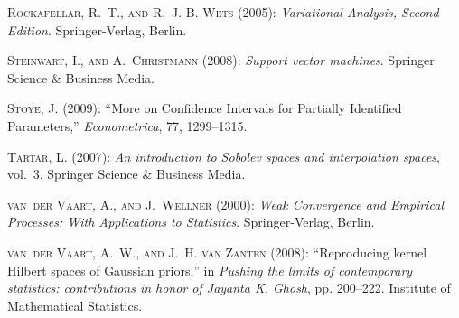 \documentclass[letterpaper,11pt]{article}
\theoremstyle{myplain}
\theoremstyle{mydefinition}
\theoremstyle{myremark}
\numberwithin{equation}{section}
\numberwithin{figure}{section}
\begin{document}
\begin{thebibliography}{}
\textsc{Rockafellar, R.~T.,  {\small and} R.~J.-B. Wets}  (2005):
  \emph{Variational Analysis, Second Edition}. Springer-Verlag, Berlin.

\textsc{Steinwart, I.,  {\small and} A.~Christmann}  (2008): \emph{Support
  vector machines}. Springer Science \& Business Media.

\textsc{Stoye, J.}  (2009): ``More on Confidence Intervals for Partially
  Identified Parameters,'' \emph{Econometrica}, 77, 1299--1315.

\textsc{Tartar, L.}  (2007): \emph{An introduction to Sobolev spaces and
  interpolation spaces}, vol.~3. Springer Science \& Business Media.

\textsc{van~der Vaart, A.,  {\small and} J.~Wellner}  (2000): \emph{Weak
  Convergence and Empirical Processes: With Applications to Statistics}.
  Springer-Verlag, Berlin.

\textsc{van~der Vaart, A.~W.,  {\small and} J.~H. van Zanten}  (2008):
  ``Reproducing kernel Hilbert spaces of Gaussian priors,'' in \emph{Pushing
  the limits of contemporary statistics: contributions in honor of Jayanta K.
  Ghosh}, pp. 200--222. Institute of Mathematical Statistics.

\end{thebibliography}

 
\end{document}
